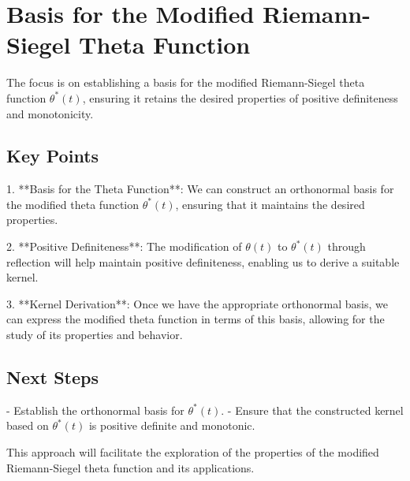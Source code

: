 \section{Basis for the Modified Riemann-Siegel Theta Function}

The focus is on establishing a basis for the modified Riemann-Siegel theta function $\theta^*(t)$, ensuring it retains the desired properties of positive definiteness and monotonicity.

\subsection{Key Points}
1. **Basis for the Theta Function**: We can construct an orthonormal basis for the modified theta function $\theta^*(t)$, ensuring that it maintains the desired properties.

2. **Positive Definiteness**: The modification of $\theta(t)$ to $\theta^*(t)$ through reflection will help maintain positive definiteness, enabling us to derive a suitable kernel.

3. **Kernel Derivation**: Once we have the appropriate orthonormal basis, we can express the modified theta function in terms of this basis, allowing for the study of its properties and behavior.

\subsection{Next Steps}
- Establish the orthonormal basis for $\theta^*(t)$.
- Ensure that the constructed kernel based on $\theta^*(t)$ is positive definite and monotonic.

This approach will facilitate the exploration of the properties of the modified Riemann-Siegel theta function and its applications.